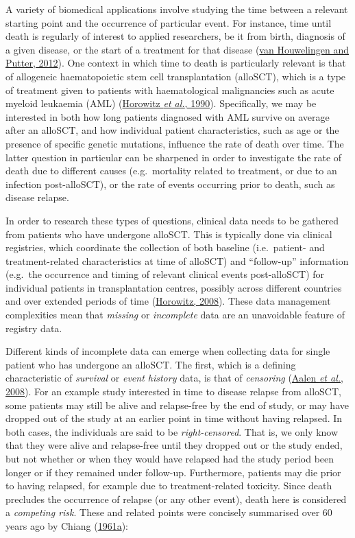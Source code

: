 \documentclass[
  letterpaper,
  DIV=11,
  numbers=noendperiod]{scrreprt}
\begin{document}
A variety of biomedical applications involve studying the time between a
relevant starting point and the occurrence of particular event. For
instance, time until death is regularly of interest to applied
researchers, be it from birth, diagnosis of a given disease, or the
start of a treatment for that disease
(\protect\hyperlink{ref-vanhouwelingenDynamicPredictionClinical2012}{van
Houwelingen and Putter, 2012}). One context in which time to death is
particularly relevant is that of allogeneic haematopoietic stem cell
transplantation (alloSCT), which is a type of treatment given to
patients with haematological malignancies such as acute myeloid
leukaemia (AML)
(\protect\hyperlink{ref-horowitzGraftversusleukemiaReactionsBone1990}{Horowitz
\emph{et al.}, 1990}). Specifically, we may be interested in both how
long patients diagnosed with AML survive on average after an alloSCT,
and how individual patient characteristics, such as age or the presence
of specific genetic mutations, influence the rate of death over time.
The latter question in particular can be sharpened in order to
investigate the rate of death due to different causes (e.g.~mortality
related to treatment, or due to an infection post-alloSCT), or the rate
of events occurring prior to death, such as disease relapse.

In order to research these types of questions, clinical data needs to be
gathered from patients who have undergone alloSCT. This is typically
done via clinical registries, which coordinate the collection of both
baseline (i.e.~patient- and treatment-related characteristics at time of
alloSCT) and ``follow-up'' information (e.g.~the occurrence and timing
of relevant clinical events post-alloSCT) for individual patients in
transplantation centres, possibly across different countries and over
extended periods of time
(\protect\hyperlink{ref-horowitzRoleRegistriesFacilitating2008}{Horowitz,
2008}). These data management complexities mean that \emph{missing} or
\emph{incomplete} data are an unavoidable feature of registry data.

Different kinds of incomplete data can emerge when collecting data for
single patient who has undergone an alloSCT. The first, which is a
defining characteristic of \emph{survival} or \emph{event history} data,
is that of \emph{censoring} (\protect\hyperlink{ref-Aalen2008}{Aalen
\emph{et al.}, 2008}). For an example study interested in time to
disease relapse from alloSCT, some patients may still be alive and
relapse-free by the end of study, or may have dropped out of the study
at an earlier point in time without having relapsed. In both cases, the
individuals are said to be \emph{right-censored}. That is, we only know
that they were alive and relapse-free until they dropped out or the
study ended, but not whether or when they would have relapsed had the
study period been longer or if they remained under follow-up.
Furthermore, patients may die prior to having relapsed, for example due
to treatment-related toxicity. Since death precludes the occurrence of
relapse (or any other event), death here is considered a \emph{competing
risk}. These and related points were concisely summarised over 60 years
ago by Chiang
(\protect\hyperlink{ref-chiangStochasticStudyLife1961}{1961a}):
\end{document}
